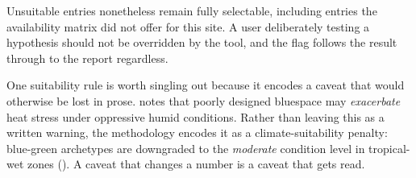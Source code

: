 Unsuitable entries nonetheless remain fully selectable, including entries the
availability matrix did not offer for this site. A user deliberately testing a
hypothesis should not be overridden by the tool, and the flag follows the result
through to the report regardless.

One suitability rule is worth singling out because it encodes a caveat that
would otherwise be lost in prose. \textcite{gunawardena2017} notes that poorly
designed bluespace may \emph{exacerbate} heat stress under oppressive humid
conditions. Rather than leaving this as a written warning, the methodology
encodes it as a climate-suitability penalty: blue-green archetypes are
downgraded to the \emph{moderate} condition level in tropical-wet zones
(). A caveat that changes a number is a caveat that
gets read.
